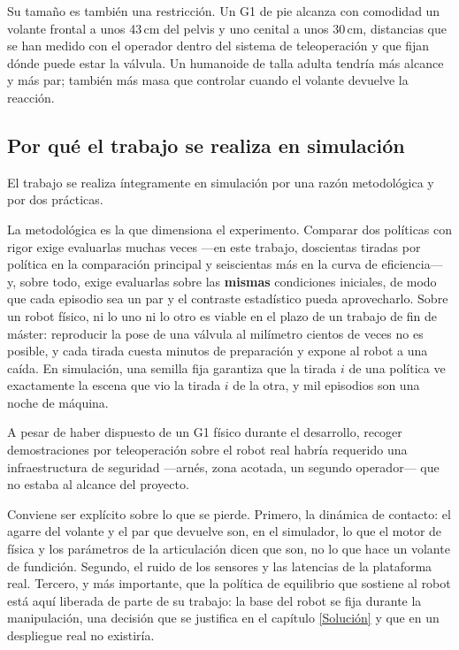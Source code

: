 Su tamaño es también una restricción. Un G1 de pie alcanza con comodidad un volante frontal a unos
43\,cm del pelvis y uno cenital a unos 30\,cm, distancias que se han medido con el operador dentro
del sistema de teleoperación y que fijan dónde puede estar la válvula. Un humanoide de talla adulta
tendría más alcance y más par; también más masa que controlar cuando el volante devuelve la
reacción.

\subsection{Por qué el trabajo se realiza en simulación}
\label{sec:por-que-simulacion}

El trabajo se realiza íntegramente en simulación por una razón metodológica y por dos prácticas.

La metodológica es la que dimensiona el experimento. Comparar dos políticas con rigor exige
evaluarlas muchas veces —en este trabajo, doscientas tiradas por política en la comparación
principal y seiscientas más en la curva de eficiencia— y, sobre todo, exige evaluarlas sobre las
\textbf{mismas} condiciones iniciales, de modo que cada episodio sea un par y el contraste
estadístico pueda aprovecharlo. Sobre un robot físico, ni lo uno ni lo otro es viable en el plazo de
un trabajo de fin de máster: reproducir la pose de una válvula al milímetro cientos de veces no es
posible, y cada tirada cuesta minutos de preparación y expone al robot a una caída. En simulación,
una semilla fija garantiza que la tirada $i$ de una política ve exactamente la escena que vio la
tirada $i$ de la otra, y mil episodios son una noche de máquina.

A pesar de haber dispuesto de un G1 físico durante el desarrollo, recoger demostraciones por teleoperación sobre el robot real habría requerido una infraestructura de seguridad —arnés, zona acotada, un segundo operador— que no estaba
al alcance del proyecto.

Conviene ser explícito sobre lo que se pierde. Primero, la dinámica de contacto: el agarre del
volante y el par que devuelve son, en el simulador, lo que el motor de física y los parámetros de la
articulación dicen que son, no lo que hace un volante de fundición. Segundo, el ruido de los sensores
y las latencias de la plataforma real. Tercero, y más importante, que la política de equilibrio que
sostiene al robot está aquí liberada de parte de su trabajo: la base del robot se fija durante la
manipulación, una decisión que se justifica en el capítulo \ref{Solución} y que en un despliegue
real no existiría.

